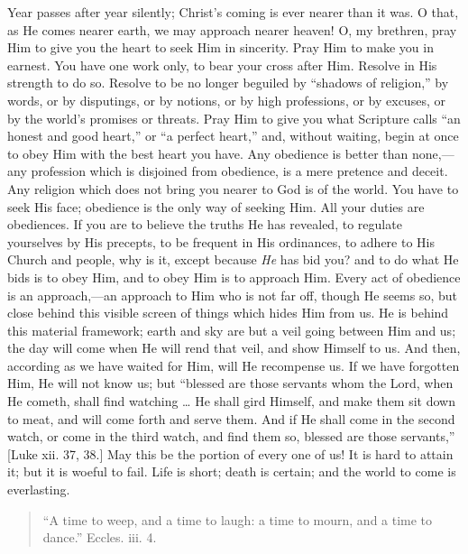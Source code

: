 Year passes after year silently; Christ's coming is ever nearer
than it was. O that, as He comes nearer earth, we may approach nearer
heaven! O, my brethren, pray Him to give you the heart to seek Him in
sincerity. Pray Him to make you in earnest. You have one work only, to
bear your cross after Him. Resolve in His strength to do so. Resolve
to be no longer beguiled by ``shadows of religion,'' by words,
or by disputings, or by notions, or by high professions, or by
excuses, or by the world's promises or threats. Pray Him to give you
what Scripture calls ``an honest and good heart,'' or ``a
perfect heart,'' and, without waiting, begin at once to obey Him
with the best heart you have. Any obedience is better than none,—any
profession which is disjoined from obedience, is a mere pretence and
deceit. Any religion which does not bring you nearer to God is of the
world. You have to seek His face; obedience is the only way of seeking
Him. All your duties are obediences. If you are to believe the truths
He has revealed, to regulate yourselves by His precepts, to be
frequent in His ordinances, to adhere to His Church and people, why is
it, except because \emph{He} has bid you? and to do what He bids is to
obey Him, and to obey Him is to approach Him. Every act of obedience
is an approach,—an approach to Him who is not far off, though He
seems so, but close behind this visible screen of things which hides
Him from us. He is behind this material framework; earth and sky are
but a veil going between Him and us; the day will come when He will
rend that veil, and show Himself to us. And then, according as we have
waited for Him, will He recompense us. If we have forgotten Him, He
will not know us; but ``blessed are those servants whom the Lord,
when He cometh, shall find watching … He shall gird Himself, and make
them sit down to meat, and will come forth and serve them. And if He
shall come in the second watch, or come in the third watch, and find
them so, blessed are those servants,'' [Luke xii. 37, 38.] May
this be the portion of every one of us! It is hard to attain it; but
it is woeful to fail. Life is short; death is certain; and the world
to come is everlasting.


\begin{quote}

``A time to weep, and a time to laugh: a time to mourn, and a
time to dance.'' Eccles. iii. 4.

\end{quote}

